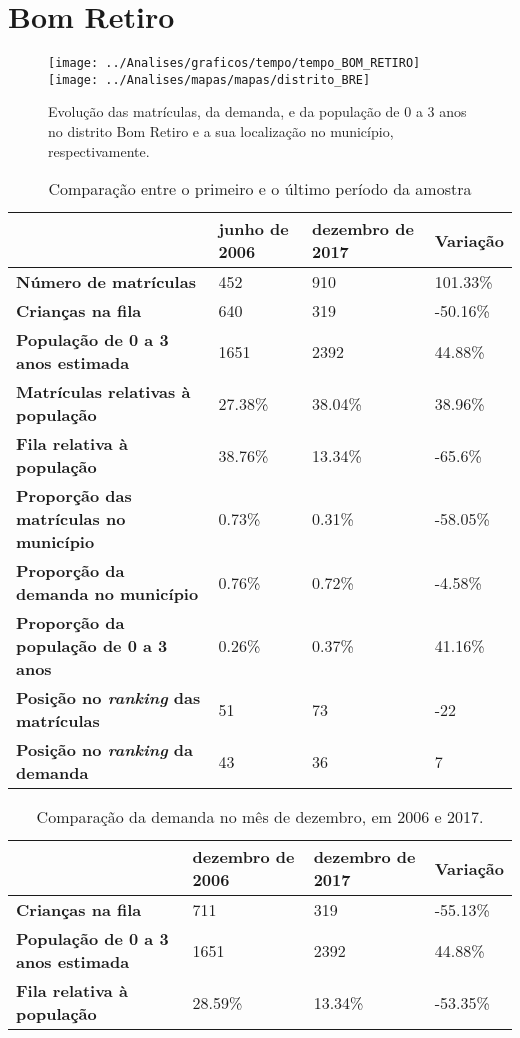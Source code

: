 \section{Bom Retiro}
\begin{figure}[H]
\centering
\texttt{[image: ../Analises/graficos/tempo/tempo\_BOM\_RETIRO]}
\texttt{[image: ../Analises/mapas/mapas/distrito\_BRE]}
\caption{Evolução das matrículas, da demanda, e da população de 0 a 3 anos no distrito Bom Retiro e a sua localização no município, respectivamente.}
\end{figure}
\begin{table}[H]
\begin{tabular}{l|l|l|l}
\textbf{}                                      & \textbf{junho de 2006}       & \textbf{dezembro de 2017}    & \textbf{Variação} \\ \hline
\textbf{Número de matrículas}                  & 452 & 910 & 101.33\% \\ \hline
\textbf{Crianças na fila}                      & 640 & 319 & -50.16\% \\ \hline
\textbf{População de 0 a 3 anos estimada}      & 1651 & 2392 & 44.88\% \\ \hline
\textbf{Matrículas relativas à população}      & 27.38\% & 38.04\% & 38.96\% \\ \hline
\textbf{Fila relativa à população}             & 38.76\% & 13.34\% & -65.6\% \\ \hline
\textbf{Proporção das matrículas no município} & 0.73\% & 0.31\% & -58.05\% \\ \hline
\textbf{Proporção da demanda no município}     & 0.76\% & 0.72\% & -4.58\% \\ \hline
\textbf{Proporção da população de 0 a 3 anos}  & 0.26\% & 0.37\% & 41.16\% \\ \hline
\textbf{Posição no \textit{ranking} das matrículas}     & 51 & 73 & -22 \\ \hline
\textbf{Posição no \textit{ranking} da demanda}         & 43 & 36 & 7 \\ 
\end{tabular}
\caption{Comparação entre o primeiro e o último período da amostra}
\end{table}
\begin{table}[H]
\begin{tabular}{l|l|l|l}
\textbf{}                                 & \textbf{dezembro de 2006} & \textbf{dezembro de 2017} & \textbf{Variação} \\ \hline
\textbf{Crianças na fila}                      & 711 & 319 & -55.13\% \\ \hline
\textbf{População de 0 a 3 anos estimada}      & 1651 & 2392 & 44.88\% \\ \hline
\textbf{Fila relativa à população}             & 28.59\% & 13.34\% & -53.35\% \\
\end{tabular}
\caption{Comparação da demanda no mês de dezembro, em 2006 e 2017.}
\end{table}
